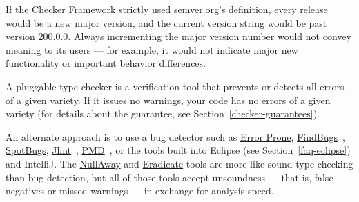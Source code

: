 If the Checker Framework strictly used semver.org's definition, every
release would be a new major version, and the current version string would
be
past version 200.0.0.
Always incrementing the major version number would not convey meaning to
its users --- for example, it would not indicate major new functionality or
important behavior differences.






A pluggable type-checker
is a verification tool that prevents or detects all errors of a given
variety.  If it issues no warnings, your code has no errors of a given
variety (for details about the guarantee, see
Section~\ref{checker-guarantees}).

An alternate approach is to use a bug detector such as
\href{https://errorprone.info/}{Error Prone},
\href{https://findbugs.sourceforge.net/}{FindBugs}~\cite{HovemeyerP2004,HovemeyerSP2005},
\href{https://github.com/spotbugs/spotbugs}{SpotBugs},
\href{https://jlint.sourceforge.net/}{Jlint}~\cite{Artho2001},
\href{https://pmd.github.io/}{PMD}~\cite{Copeland2005},
or the
tools built into Eclipse (see Section~\ref{faq-eclipse}) and IntelliJ\@.
The \href{https://github.com/uber/NullAway}{NullAway} and
\href{https://fbinfer.com/docs/1.1.0/checker-eradicate/}{Eradicate} tools are more
like sound type-checking than bug detection, but all of those tools accept
unsoundness --- that is, false negatives or missed warnings --- in exchange
for analysis speed.

